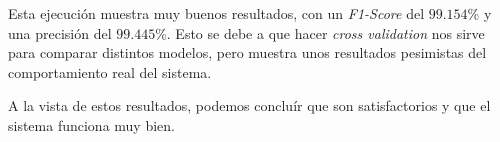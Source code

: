 \documentclass[12pt]{article}
\begin{document}
\bigskip
Esta ejecución muestra muy buenos resultados, con un \textit{F1-Score} del $99.154\%$ y una precisión
del $99.445\%$. Esto se debe a que hacer \textit{cross validation} nos sirve para comparar distintos modelos, 
pero muestra unos resultados pesimistas del comportamiento real del sistema.

\bigskip 
A la vista de estos resultados, podemos concluír que son satisfactorios y que el sistema funciona
muy bien.

\begin{table}[!ht]
	\centering

\end{table}
\end{document}
